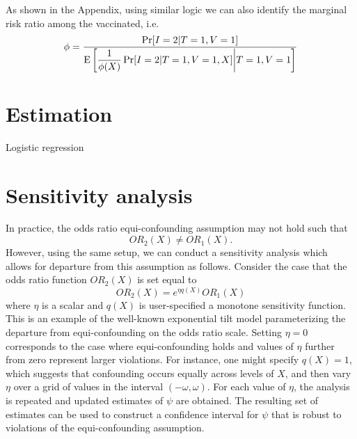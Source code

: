 \documentclass[11pt]{article}
\begin{document}
As shown in the Appendix, using similar logic we can also identify the marginal risk ratio among the vaccinated, i.e.
\begin{equation*}
    \phi =  \dfrac{\Pr[I = 2 | T = 1, V = 1]}{\operatorname{E}\left[\dfrac{1}{\phi(X)} \Pr[I = 2 | T = 1, V = 1, X] \bigg| T = 1, V = 1\right]} 
\end{equation*}


\section{Estimation}

Logistic regression 

\section{Sensitivity analysis}
In practice, the odds ratio equi-confounding assumption may not hold such that
$$OR_2(X) \neq OR_1(X).$$ 
However, using the same setup, we can conduct a sensitivity analysis which allows for departure from this assumption as follows. Consider the case that the odds ratio function $OR_2(X)$ is set equal to
$$ OR_2(X) = e^{\eta q(X)} OR_1(X) $$
where $\eta$ is a scalar and $q(X)$ is user-specified a monotone sensitivity function. This is an example of the well-known exponential tilt model parameterizing the departure from equi-confounding on the odds ratio scale. Setting $\eta = 0$ corresponds to the case where equi-confounding holds and values of $\eta$ further from zero represent larger violations. For instance, one might specify $q(X) = 1$, which suggests that confounding occurs equally across levels of $X$, and then vary $\eta$ over a grid of values in the interval $(-\omega, \omega)$. For each value of $\eta$, the analysis is repeated and updated estimates of $\psi$ are obtained. The resulting set of estimates can be used to construct a confidence interval for $\psi$ that is robust to violations of the equi-confounding assumption.
\end{document}
